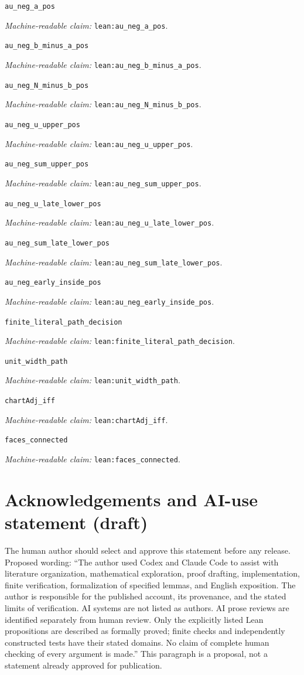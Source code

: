\documentclass[11pt]{amsart}
\newcommand{\record}[1]{\nolinkurl{#1}}
\newcommand{\claimid}[1]{\par\nopagebreak\noindent\textit{Machine-readable claim:} \record{#1}.\par}
\begin{document}
\par\noindent\label{lean:au_neg_a_pos}\record{au_neg_a_pos}
\claimid{lean:au_neg_a_pos}
\par\noindent\label{lean:au_neg_b_minus_a_pos}\record{au_neg_b_minus_a_pos}
\claimid{lean:au_neg_b_minus_a_pos}
\par\noindent\label{lean:au_neg_N_minus_b_pos}\record{au_neg_N_minus_b_pos}
\claimid{lean:au_neg_N_minus_b_pos}
\par\noindent\label{lean:au_neg_u_upper_pos}\record{au_neg_u_upper_pos}
\claimid{lean:au_neg_u_upper_pos}
\par\noindent\label{lean:au_neg_sum_upper_pos}\record{au_neg_sum_upper_pos}
\claimid{lean:au_neg_sum_upper_pos}
\par\noindent\label{lean:au_neg_u_late_lower_pos}\record{au_neg_u_late_lower_pos}
\claimid{lean:au_neg_u_late_lower_pos}
\par\noindent\label{lean:au_neg_sum_late_lower_pos}\record{au_neg_sum_late_lower_pos}
\claimid{lean:au_neg_sum_late_lower_pos}
\par\noindent\label{lean:au_neg_early_inside_pos}\record{au_neg_early_inside_pos}
\claimid{lean:au_neg_early_inside_pos}
\par\noindent\label{lean:finite_literal_path_decision}\record{finite_literal_path_decision}
\claimid{lean:finite_literal_path_decision}

\par\noindent\label{lean:unit_width_path}\record{unit_width_path}
\claimid{lean:unit_width_path}
\par\noindent\label{lean:chartAdj_iff}\record{chartAdj_iff}
\claimid{lean:chartAdj_iff}
\par\noindent\label{lean:faces_connected}\record{faces_connected}
\claimid{lean:faces_connected}

\section*{Acknowledgements and AI-use statement (draft)}
The human author should select and approve this statement before any
release. Proposed wording: ``The author used Codex and Claude Code
to assist with literature organization, mathematical exploration,
proof drafting, implementation, finite verification, formalization of
specified lemmas, and English exposition. The author is responsible
for the published account, its provenance, and the stated limits of
verification. AI systems are not listed as authors. AI prose reviews
are identified separately from human review. Only the explicitly
listed Lean propositions are described as formally proved; finite
checks and independently constructed tests have their stated domains.
No claim of complete human checking of every argument is made.''
This paragraph is a proposal, not a statement already approved for publication.
\end{document}
